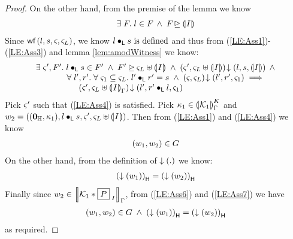 \begin{lemma}[]
\begin{proof}
On the other hand, from the premise of the lemma we know 
%
\begin{align}
	\exsts{\fence{}} l \in \fence{} \;\land\; \fence{} \strictfences \intermediateSemI{I} \label{LE:Ass3}
\end{align}
Since $\wf{l, s, \amod{}, \amod{L}}$, we know $l \composeL s \text{ is defined}$ and thus from (\ref{LE:Ass1})-(\ref{LE:Ass3}) and lemma \ref{lem:amodWitness} we know:
%
\begin{align}
\begin{array}{l}
	\exsts{\amod{}', \fence{}'} l \composeL s \in \fence{}' \;\land\; \fence{}' \strictfences \amod{L} \uplus \intermediateSemI{I} \;\land\; \extendsAM{\amod{}', \amod{L} \uplus \intermediateSemI{I}}{l}{s}{\intermediateSemI{I}} \;\land\\
	\hspace*{1.3cm}\for{l', r'} \for{\amod{1} \subseteq \amod{L}} l' \composeL r' = s \;\land\; \extendsAM{\amod{}, \amod{L}}{l'}{r'}{\amod{1}} \implies\\
	\hspace*{1.8cm}\extendsAM{\amod{}', \amod{L} \uplus \intermediateSem{I}}{l'}{r' \composeL l}{\amod{1}} 
\end{array}\label{LE:Ass4}
\end{align}
%
Pick $\amod{}'$ such that (\ref{LE:Ass4}) is satisfied. Pick $\ca{1} \in \semK[\lenv]{\capAss{1}}$ and $w_2 = ( (\unitH, \ca{1}), l \composeL s, \amod{}', \amod{L} \uplus \intermediateSemI{I} )$. Then from (\ref{LE:Ass1}) and (\ref{LE:Ass4}) we know
%
\begin{align}
	(w_1, w_2) \in \guarantee \label{LE:Ass6}
\end{align}
%
On the other hand, from the definition of $\collapseW{.}$ we know:
\begin{align}
	\heapPart{\left(\collapseW{w_1}\right)} = \heapPart{\left(\collapseW{w_2}\right)} \label{LE:Ass7}
\end{align}
%
Finally since $w_2 \in \sem[\lenv]{\capAss{1} * \shared{P}{I}}$, from (\ref{LE:Ass6}) and (\ref{LE:Ass7}) we have
%
\begin{align}
	(w_1, w_2) \in \guarantee \;\land\; \heapPart{\left(\collapseW{w_1}\right)} = \heapPart{\left(\collapseW{w_2}\right)}
\end{align}
%
as required.
\end{proof}
\end{lemma}
